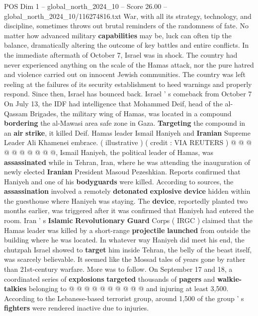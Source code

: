\begin{textsample}{POS Dim 1 – global\_north\_2024\_10 – Score 26.00 – global\_north\_2024\_10/116274816.txt}  \label{ex:f1_pos_085}
War, with all its strategy, technology, and discipline, sometimes throws out brutal reminders of the randomness of fate.
No matter how advanced military \textbf{capabilities} may be, luck can often tip the balance, dramatically altering the outcome of key battles and entire conflicts.
In the immediate aftermath of October 7, Israel was in shock.
The country had never experienced anything on the scale of the Hamas attack, nor the pure hatred and violence carried out on innocent Jewish communities.
The country was left reeling at the failures of its security establishment to heed warnings and properly respond.
Since then, Israel has bounced back.
Israel ' s comeback from October 7 On July 13, the IDF had intelligence that Mohammed Deif, head of the al-Qassam Brigades, the military wing of Hamas, was located in a compound \textbf{bordering} the al-Mawasi area safe zone in Gaza. \textbf{Targeting} the compound in an \textbf{air} \textbf{strike}, it killed Deif.
Hamas leader Ismail Haniyeh and \textbf{Iranian} Supreme Leader Ali Khamenei embrace. ( illustrative ) ( credit : VIA REUTERS ) @ @ @ @ @ @ @ @ @ @, Ismail Haniyeh, the political leader of Hamas, was \textbf{assassinated} while in Tehran, Iran, where he was attending the inauguration of newly elected \textbf{Iranian} President Masoud Pezeshkian.
Reports confirmed that Haniyeh and one of his \textbf{bodyguards} were killed.
According to sources, the \textbf{assassination} involved a remotely \textbf{detonated} \textbf{explosive} \textbf{device} hidden within the guesthouse where Haniyeh was staying.
The \textbf{device}, reportedly planted two months earlier, was triggered after it was confirmed that Haniyeh had entered the room.
Iran ' s \textbf{Islamic} \textbf{Revolutionary} \textbf{Guard} Corps ( IRGC ) claimed that the Hamas leader was killed by a short-range \textbf{projectile} \textbf{launched} from outside the building where he was located.
In whatever way Haniyeh did meet his end, the chutzpah Israel showed to \textbf{target} him inside Tehran, the belly of the beast itself, was scarcely believable.
It seemed like the Mossad tales of years gone by rather than 21st-century warfare.
More was to follow.
On September 17 and 18, a coordinated series of \textbf{explosions} \textbf{targeted} thousands of \textbf{pagers} and \textbf{walkie-talkies} belonging to @ @ @ @ @ @ @ @ @ @ and injuring at least 3,500.
According to the Lebanese-based terrorist group, around 1,500 of the group ' s \textbf{fighters} were rendered inactive due to injuries.

\end{textsample}
